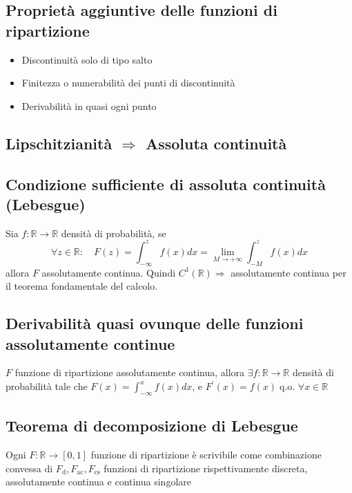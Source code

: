 \documentclass[a4paper,10pt]{article}
\theoremstyle{remark}
\theoremstyle{definition}
\begin{document}
\subsection*{Proprietà aggiuntive delle funzioni di ripartizione}
\begin{itemize}
    \item Discontinuità solo di tipo salto
    \item Finitezza o numerabilità dei punti
di discontinuità
\item Derivabilità in quasi ogni punto
\end{itemize}


\subsection*{Lipschitzianità $\Rightarrow$ Assoluta continuità}

\subsection*{Condizione sufficiente di assoluta continuità (Lebesgue)}

Sia $f:\mathbb{R}\rightarrow\mathbb{R}$ densità di probabilità, se
$$\forall z\in\mathbb{R}:\quad F\left(z\right)=\int_{-\infty}^{z}f\left(x\right)dx=\lim_{M\rightarrow+\infty}\int_{-M}^{z}f\left(x\right)dx$$
allora $F$ assolutamente continua. Quindi $C^{1}\left(\mathbb{R}\right)\Rightarrow$
assolutamente continua per il teorema fondamentale del calcolo.

\subsection*{Derivabilità quasi ovunque delle funzioni assolutamente continue}

$F$ funzione di ripartizione assolutamente continua, allora $\exists f:\mathbb{R}\rightarrow\mathbb{R}$
densità di probabilità tale che $F\left(x\right)=\int_{-\infty}^{x}f\left(x\right)dx$,
e $F^{\prime}\left(x\right)=f\left(x\right)\;\text{q.o. }\forall x\in\mathbb{R}$

\subsection*{Teorema di decomposizione di Lebesgue}

Ogni $F:\mathbb{R}\rightarrow\left[0,1\right]$ funzione di ripartizione
è scrivibile come combinazione convessa di $F_{\text{d}},F_{\text{ac}},F_{\text{cs}}$
funzioni di ripartizione rispettivamente discreta, assolutamente continua
e continua singolare
\end{document}
